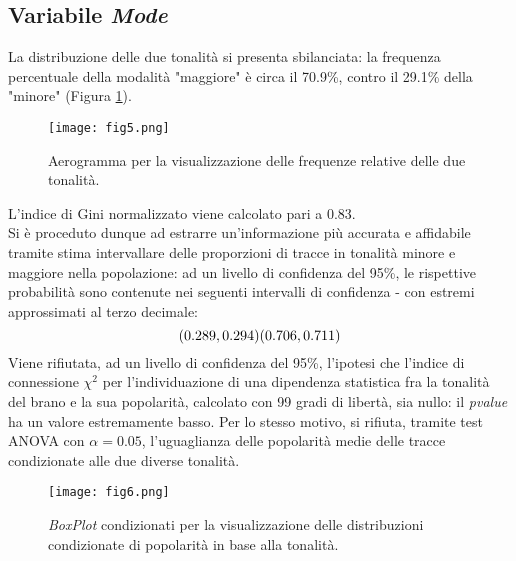 \documentclass[fleqn,10pt]{SelfArx} %
\begin{document}
\subsection*{Variabile \textit{Mode}}
La distribuzione delle due tonalità si presenta sbilanciata: la frequenza percentuale della modalità "maggiore" è circa il 70.9\%, contro il 29.1\% della "minore" (Figura \ref{fig:fig5}).
\begin{figure}[H]
    \centering
    \texttt{[image: fig5.png]}
    \label{fig:fig5}
    \caption{Aerogramma per la visualizzazione delle frequenze relative delle due tonalità.}
\end{figure}
L'indice di Gini normalizzato viene calcolato pari a 0.83.\\
Si è proceduto dunque ad estrarre un'informazione più accurata e affidabile tramite stima intervallare delle proporzioni di tracce in tonalità minore e maggiore nella popolazione: ad un livello di confidenza del 95\%, le rispettive probabilità sono contenute nei seguenti intervalli di confidenza - con estremi approssimati al terzo decimale:
\begin{equation}
    (0.289, 0.294)\\(0.706, 0.711)
\end{equation}
Viene rifiutata, ad un livello di confidenza del 95\%, l'ipotesi che l'indice di connessione $\chi^2$ per l'individuazione di una dipendenza statistica fra la tonalità del brano e la sua popolarità, calcolato con 99 gradi di libertà, sia nullo: il \textit{pvalue} ha un valore estremamente basso. Per lo stesso motivo, si rifiuta, tramite test ANOVA con $\alpha=0.05$, l'uguaglianza delle popolarità medie delle tracce condizionate alle due diverse tonalità.
\begin{figure}[H]
    \centering
    \texttt{[image: fig6.png]}
    \label{fig:fig6}
    \caption{\textit{BoxPlot} condizionati per la visualizzazione delle distribuzioni condizionate di popolarità in base alla tonalità.}
\end{figure}
\end{document}
